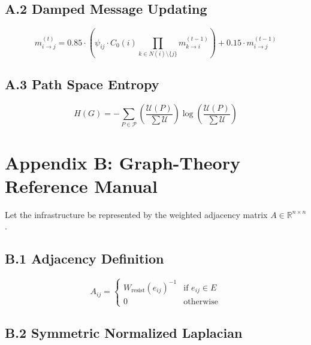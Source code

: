 \documentclass[11pt,a4paper]{article}
\theoremstyle{definition}
\numberwithin{equation}{section}
\newcommand{\set}[1]{\mathcal{#1}}
\newcommand{\R}{\mathbb{R}}
\begin{document}
\subsection*{A.2 Damped Message Updating}

\begin{equation}\label{eq:damped-msg}
m_{i \to j}^{(t)} = 0.85 \cdot \left( \psi_{ij} \cdot C_0(i) \prod_{k \in N(i) \setminus \{j\}} m_{k \to i}^{(t-1)} \right) + 0.15 \cdot m_{i \to j}^{(t-1)}
\end{equation}

\subsection*{A.3 Path Space Entropy}

\begin{equation}\label{eq:entropy-full}
H(G) = -\sum_{P \in \set{P}} \left( \frac{\set{U}(P)}{\sum \set{U}} \right) \log \left( \frac{\set{U}(P)}{\sum \set{U}} \right)
\end{equation}

\section*{Appendix B: Graph-Theory Reference Manual}

Let the infrastructure be represented by the weighted adjacency matrix $A \in \R^{n \times n}$.

\subsection*{B.1 Adjacency Definition}

\begin{equation}\label{eq:adjacency}
A_{ij} = \begin{cases} W_{\text{resist}}(e_{ij})^{-1} & \text{if } e_{ij} \in E \\ 0 & \text{otherwise} \end{cases}
\end{equation}

\subsection*{B.2 Symmetric Normalized Laplacian}
\end{document}
